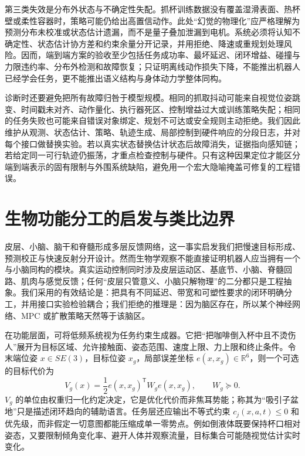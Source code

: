 第三类失效是分布外状态与不确定性失配。抓杯训练数据没有覆盖湿滑表面、热杯壁或柔性容器时，策略可能仍给出高置信动作。此处“幻觉的物理化”应严格理解为预测分布未校准或状态估计遗漏，而不是量子叠加泄漏到电机。系统必须将认知不确定性、状态估计协方差和约束余量分开记录，并用拒绝、降速或重规划处理风险。因而，端到端方案的验收至少包括任务成功率、最坏延迟、闭环增益、碰撞与力限违约率、分布外检测和故障恢复；只证明离线动作损失下降，不能推出机器人已经学会任务，更不能推出语义结构与身体动力学整体同构。

诊断时还要避免把所有故障归咎于模型规模。相同的抓取抖动可能来自视觉位姿跳变、时间戳未对齐、动作量化、执行器死区、控制增益过大或训练策略失配；相同的任务失败也可能来自错误对象绑定、规划不可达或安全规则主动拒绝。我们因此维护从观测、状态估计、策略、轨迹生成、局部控制到硬件响应的分段日志，并对每个接口做替换实验。若以真实状态替换估计状态后故障消失，证据指向感知链；若给定同一可行轨迹仍振荡，才重点检查控制与硬件。只有这种因果定位才能区分端到端表示的固有限制与外围系统缺陷，避免用一个宏大隐喻掩盖可修复的工程错误。

\section{生物功能分工的启发与类比边界}
\label{sec:bio_reference_cortex_cerebellum}

皮层、小脑、脑干和脊髓形成多层反馈网络，这一事实启发我们把慢速目标形成、预测校正与快速反射分开设计。然而生物学观察不能直接证明机器人应当拥有一个与小脑同构的模块。真实运动控制同时涉及皮层运动区、基底节、小脑、脊髓回路、肌肉与感觉反馈；任何“皮层只管意义、小脑只解物理”的二分都只是工程抽象。我们采用的有效结论是：把具有不同延迟、带宽和可塑性要求的闭环明确分工，并用接口实验检验耦合；我们拒绝的推理是：因为脑区存在，所以某个神经网络、MPC 或扩散策略天然等于该脑区。

在功能层面，可将低频系统视为任务约束生成器。它把“把咖啡倒入杯中且不烫伤人”展开为目标区域、允许接触面、姿态范围、速度上限、力上限和终止条件。令末端位姿 $x\in SE(3)$，目标位姿 $x_g$，局部误差坐标 $e(x,x_g)\in\mathbb{R}^{6}$，则一个可选的目标代价为
\begin{equation}
 V_g(x)=\frac{1}{2}e(x,x_g)^\mathsf{T}W_ge(x,x_g),\qquad W_g\succeq0.
\end{equation}
$V_g$ 的单位由权重归一化约定决定，它是优化代价而非焦耳势能；称其为“吸引子盆地”只是描述闭环趋向的辅助语言。任务层还应输出不等式约束 $c_j(x,a,t)\leq0$ 和优先级，而非假定一切意图都能压缩成单一零势点。例如倒液体既要保持杯口相对姿态，又要限制倾角变化率、避开人体并观察流量，目标集合可能随视觉估计实时变化。

